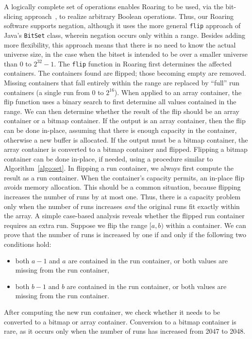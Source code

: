 \documentclass[times]{speauth}
\begin{document}
A logically complete set of operations enables Roaring to be used, via the bit-slicing approach~\cite{253268}, to realize arbitrary Boolean operations.
Thus, our Roaring software supports negation, although it uses the more general \texttt{flip} approach of Java's \texttt{BitSet} class, wherein negation
occurs only within a range.   Besides adding more flexibility, this approach means that there is no need to know the actual universe
size, in the case when the bitset is intended to be over a smaller universe than 0 to $2^{32}-1$.
The \texttt{flip} function in Roaring first determines
the affected containers. The containers found are flipped; those becoming empty are removed.
Missing containers 
that fall entirely within the range
are replaced by
``full'' run containers (a single run from 0 to $2^{16}$). 
When applied to an array container, the flip function uses a binary
search to first determine all values contained in the range. 
We can then determine whether the result of the flip should be an array container or a bitmap container. If the output is an array
container, then the flip can be done in-place, assuming that
there is enough capacity in the container, otherwise a new buffer is allocated. If the output must be a bitmap container, the array
container is converted to a bitmap container and flipped.
Flipping a bitmap container can be done in-place, if needed, using a procedure similar to Algorithm~\ref{algo:set}. In flipping 
a run container, we always first compute the result as a run container. When the container's capacity permits,
an in-place flip avoids memory allocation.  This should be a common situation, because flipping increases the number of runs by at most one.
Thus, there is a capacity problem only when the number of runs increases \emph{and} the original runs fit exactly within the array.
A simple case-based analysis reveals whether the flipped run container requires
an extra run. Suppose we flip the range $[a,b)$ within a container. 
We can prove that the number of runs is increased by one if and only if the following two conditions hold:
\begin{itemize}
\item both $a-1$ and $a$ are contained in the run container, or both values are missing  from the run container,
\item both $b-1$ and $b$ are contained in the run container, or both values are missing  from the run container.
\end{itemize}
After computing the new run container, we check whether it needs to be converted to a bitmap or array container.
Conversion to a bitmap container is rare, as it occurs only when the number of runs has increased from 2047
to 2048.
\end{document}
